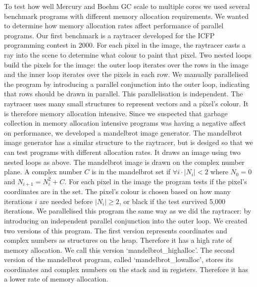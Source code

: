 To test how well Mercury and Boehm GC scale to multiple cores we used several
benchmark programs with different memory allocation requirements.
We wanted to determine how memory allocation rates affect
performance of parallel programs.
Our first benchmark is a raytracer developed for the
ICFP programming contest in 2000.
For each pixel in the image,
the raytracer casts a ray into the scene to determine what colour to paint that pixel.
Two nested loops build the pixels for the image:
the outer loop iterates over the rows in the image and
the inner loop iterates over the pixels in each row.
We manually parallelised the program by introducing a parallel
conjunction into the outer loop,
indicating that rows should be drawn in parallel.
This parallelisation is independent.
The raytracer uses many small structures to represent vectors and a pixel's
colour.
It is therefore memory allocation intensive.
Since we suspected that garbage collection in memory allocation intensive
programs was having a negative affect on performance,
we developed a mandelbrot image generator.
The mandelbrot image generator has a similar structure to the raytracer,
but is desiged so that we can test programs with different allocation rates.
It draws an image using two nested loops as above.
The mandelbrot image is drawn on the complex number plane.
A complex number $C$ is in the mandelbrot set if
$\forall i \cdot |N_i| < 2$ where $N_0 = 0$ and $N_{i+1} = N_{i}^2 + C$.
For each pixel in the image the program tests if the pixel's coordinates are
in the set.
The pixel's colour is chosen based on how many iterations $i$ are needed
before $|N_i| \ge 2$,
or black if the test survived 5,000 iterations.
We parallelised this program the same way as we did the raytracer:
by introducing an independent parallel conjunction into the outer loop.
We created two versions of this program.
The first version represents coordinates and complex numbers as structures
on the heap.
Therefore it has a high rate of memory allocation.
We call this version `mandelbrot\_highalloc'.
The second version of the mandelbrot program,
called `mandelbrot\_lowalloc',
stores its coordinates and complex numbers on the stack and in registers.
Therefore it has a lower rate of memory allocation.



